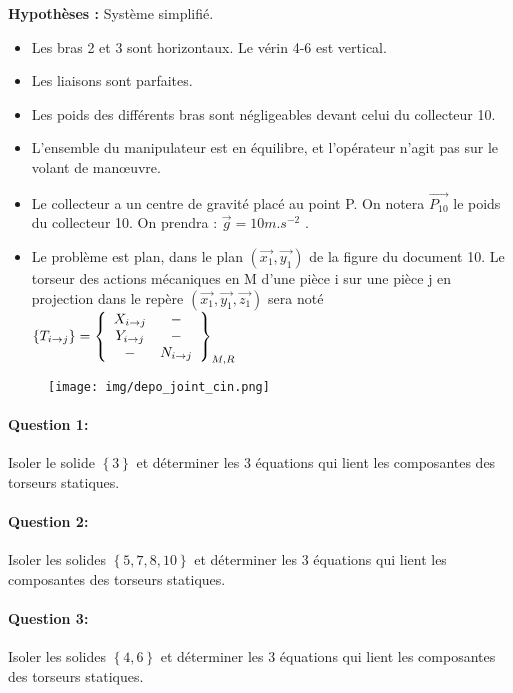 \textbf{Hypothèses :} Système simplifié.
\begin{itemize}
 \item Les bras 2 et 3 sont horizontaux. Le vérin 4-6 est vertical.
 \item Les liaisons sont parfaites.
 \item Les poids des différents bras sont négligeables devant celui du collecteur 10.
 \item L'ensemble du manipulateur est en équilibre, et l'opérateur n'agit pas sur le volant de man\oe uvre.
 \item Le collecteur a un centre de gravité placé au point P. On notera $\overrightarrow{P_{10}}$ le poids du collecteur 10. On prendra : $\overrightarrow{g}=10m.s^{-2}$ .
 \item Le problème est plan, dans le plan $(\overrightarrow{x_1},\overrightarrow{y_1})$ de la figure du document 10. Le torseur des actions mécaniques en M d'une pièce i sur une pièce j en projection dans le repère $(\overrightarrow{x_1},\overrightarrow{y_1},\overrightarrow{z_1})$ sera noté $\left\{T_{i \rightarrow j}\right\}=\left\{\begin{array}{c c}
X_{i \rightarrow j} & - \\
Y_{i \rightarrow j} & - \\
- & N_{i \rightarrow j}
\end{array}\right\}_{M,R}$
\end{itemize}

\begin{figure}[htbp]
\begin{center}
\texttt{[image: img/depo\_joint\_cin.png]}
\end{center}
\end{figure}

\paragraph{Question 1:} Isoler le solide $\left\{3\right\}$ et déterminer les 3 équations qui lient les composantes des torseurs statiques.

\paragraph{Question 2:} Isoler les solides $\left\{5,7,8,10\right\}$ et déterminer les 3 équations qui lient les composantes des torseurs statiques.

\paragraph{Question 3:} Isoler les solides $\left\{4,6\right\}$ et déterminer les 3 équations qui lient les composantes des torseurs statiques.

